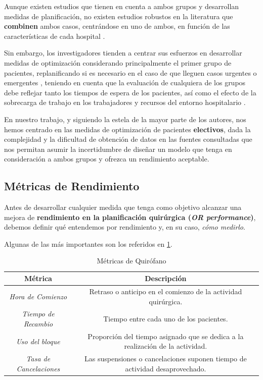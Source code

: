 Aunque existen estudios que tienen en cuenta a ambos grupos y desarrollan medidas de planificación, no existen estudios robustos en la literatura que \textbf{combinen} ambos casos, centrándose en uno de ambos, en función de las características de cada hospital \cite{Gur2018ApplicationOverview}.

Sin embargo, los investigadores tienden a centrar sus esfuerzos en desarrollar medidas de optimización considerando principalmente el primer grupo de pacientes, replanificando si es necesario en el caso de que lleguen casos urgentes o emergentes \cite{Nouaouri2011OperatingDisaster}, teniendo en cuenta que la evaluación de cualquiera de los grupos debe reflejar tanto los tiempos de espera de los pacientes, así como el efecto de la sobrecarga de trabajo en los trabajadores y recursos del entorno hospitalario \cite{Gur2018ApplicationOverview}.

En nuestro trabajo, y siguiendo la estela de la mayor parte de los autores, nos hemos centrado en las medidas de optimización de pacientes \textbf{electivos}, dada la complejidad y la dificultad de obtención de datos en las fuentes consultadas que nos permitan asumir la incertidumbre de diseñar un modelo que tenga en consideración a ambos grupos y ofrezca un rendimiento aceptable.

\subsection{Métricas de Rendimiento}
Antes de desarrollar cualquier medida que tenga como objetivo alcanzar una mejora de \textbf{rendimiento en la planificación quirúrgica (\textit{OR performance})}, debemos definir qué entendemos por rendimiento y, en su caso, \textit{cómo medirlo}. 

Algunas de las más importantes son los referidos en \ref{Métricas de Quirófano}.
\begin{table}[]
    \centering
    \begin{tabular}{c|c}
        \toprule
            \textbf{Métrica}   &  \textbf{Descripción}  \\
         \midrule
              \textit{Hora de Comienzo}  &  Retraso o anticipo en el comienzo de la actividad quirúrgica. \\
              \textit{Tiempo de Recambio }& Tiempo entre cada uno de los pacientes. \\
              \textit{Uso del bloque} & Proporción del tiempo asignado que se dedica a la realización de la actividad. \\
              \textit{Tasa de Cancelaciones} & Las suspensiones o cancelaciones suponen tiempo de actividad desaprovechado. \\
       \bottomrule
    \end{tabular}
    \caption{Métricas de Quirófano}
    \label{Métricas de Quirófano}
\end{table}

